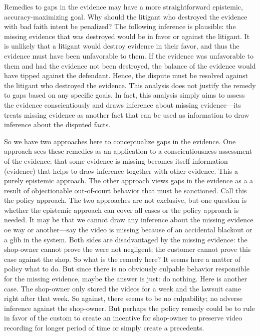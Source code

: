 \documentclass[
  10pt,
  dvipsnames,enabledeprecatedfontcommands]{scrartcl}
\begin{document}
Remedies to gaps in the evidence may have a more straightforward
epistemic, accuracy-maximizing goal. Why should the litigant who
destroyed the evidence with bad faith intent be penalized? The following
inference is plausible: the missing evidence that was destroyed would be
in favor or against the litigant. It is unlikely that a litigant would
destroy evidence in their favor, and thus the evidence must have been
unfavorable to them. If the evidence was unfavorable to them and had the
evidence not been destroyed, the balance of the evidence would have
tipped against the defendant. Hence, the dispute must be resolved
against the litigant who destroyed the evidence. This analysis does not
justify the remedy to gaps based on any specific goals. In fact, this
analysis simply aims to assess the evidence conscientiously and draws
inference about missing evidence---its treats missing evidence as
another fact that can be used as information to draw inference about the
disputed facts.

So we have two approaches here to conceptualize gaps in the evidence.
One approach sees these remedies as an application to a
conscientiousness assessment of the evidence: that some evidence is
missing becomes itself information (evidence) that helps to draw
inference together with other evidence. This a purely epistemic
approach. The other approach views gaps in the evidence as a a result of
objectionable out-of-court behavior that must be sanctioned. Call this
the policy approach. The two approaches are not exclusive, but one
question is whether the epistemic approach can cover all cases or the
policy approach is needed. It may be that we cannot draw any inference
about the missing evidence oe way or another---say the video is missing
because of an accidental blackout or a glib in the system. Both sides
are disadvantaged by the missing evidence: the shop-owner cannot prove
the were not negligent; the customer cannot prove this case against the
shop. So what is the remedy here? It seems here a matter of policy what
to do. But since there is no obviously culpable behavior responsible for
the missing evidence, maybe the answer is just: do nothing. Here is
another case. The shop-owner only stored the videos for a week and the
lawsuit came right after that week. So against, there seems to be no
culpability; no adverse inference against the shop-owner. But perhaps
the policy remedy could be to rule in favor of the custom to create an
incentive for shop-owner to preserve video recording for longer period
of time or simply create a precedents.
\end{document}
